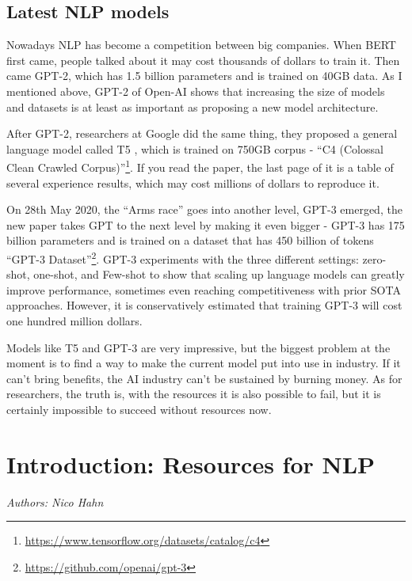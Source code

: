 \documentclass[]{krantz}
\renewcommand{\href}[2]{#2\footnote{\url{#1}}}
\begin{document}
\hypertarget{latest-nlp-models}{%
\section{Latest NLP models}\label{latest-nlp-models}}

Nowadays NLP has become a competition between big companies. When BERT first came, people talked about it may cost thousands of dollars to train it. Then came GPT-2, which has 1.5 billion parameters and is trained on 40GB data. As I mentioned above, GPT-2 of Open-AI shows that increasing the size of models and datasets is at least as important as proposing a new model architecture.

After GPT-2, researchers at Google did the same thing, they proposed a general language model called T5 \citet{raffel2019exploring}, which is trained on 750GB corpus - \href{https://www.tensorflow.org/datasets/catalog/c4}{``C4 (Colossal Clean Crawled Corpus)''}. If you read the paper, the last page of it is a table of several experience results, which may cost millions of dollars to reproduce it.

On 28th May 2020, the ``Arms race'' goes into another level, GPT-3 \citet{brown2020language} emerged, the new paper takes GPT to the next level by making it even bigger - GPT-3 has 175 billion parameters and is trained on a dataset that has 450 billion of tokens \href{https://github.com/openai/gpt-3}{``GPT-3 Dataset''}. GPT-3 experiments with the three different settings: zero-shot, one-shot, and Few-shot to show that scaling up language models can greatly improve performance, sometimes even reaching competitiveness with prior SOTA approaches. However, it is conservatively estimated that training GPT-3 will cost one hundred million dollars.

Models like T5 and GPT-3 are very impressive, but the biggest problem at the moment is to find a way to make the current model put into use in industry. If it can't bring benefits, the AI industry can't be sustained by burning money. As for researchers, the truth is, with the resources it is also possible to fail, but it is certainly impossible to succeed without resources now.

\hypertarget{introduction-resources-for-nlp}{%
\chapter{Introduction: Resources for NLP}\label{introduction-resources-for-nlp}}

\emph{Authors: Nico Hahn}
\end{document}
